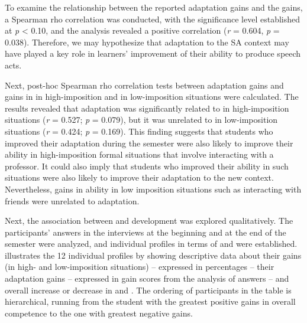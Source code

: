\documentclass[output=paper]{langsci/langscibook}
\begin{document}
  
To examine the relationship between the reported  adaptation gains and the  gains, a Spearman rho correlation was conducted, with the significance level established at \textit{p} < 0.10, and the analysis revealed a positive correlation (\textit{r} = 0.604, \textit{p} = 0.038). Therefore, we may hypothesize that adaptation to the SA context may have played a key role in learners’ improvement of their ability to produce speech acts. 

Next, post-hoc Spearman rho correlation tests between adaptation gains and gains in  in high-imposition and in low-imposition situations were calculated. The results revealed that  adaptation was significantly related to  in high-imposition situations (\textit{r} = 0.527; \textit{p} = 0.079), but it was unrelated to  in low-imposition situations (\textit{r} = 0.424; \textit{p} = 0.169). This finding suggests that students who improved their  adaptation during the semester were also likely to improve their  ability in high-imposition formal situations that involve interacting with a professor. It could also imply that students who improved their  ability in such situations were also likely to improve their adaptation to the new context. Nevertheless, gains in  ability in low imposition situations such as interacting with friends were unrelated to  adaptation. 

Next, the association between  and  development was explored qualitatively. The participants’ answers in the interviews at the beginning and at the end of the semester were analyzed, and individual profiles in terms of  and  were established.  illustrates the 12 individual profiles by showing descriptive data about their  gains (in high- and low-imposition situations) – expressed in percentages – their  adaptation gains – expressed in gain scores from the analysis of  answers – and overall increase or decrease in  and . The ordering of participants in the table is hierarchical, running from the student with the greatest positive gains in overall  competence to the one with greatest negative gains.
\end{document}
